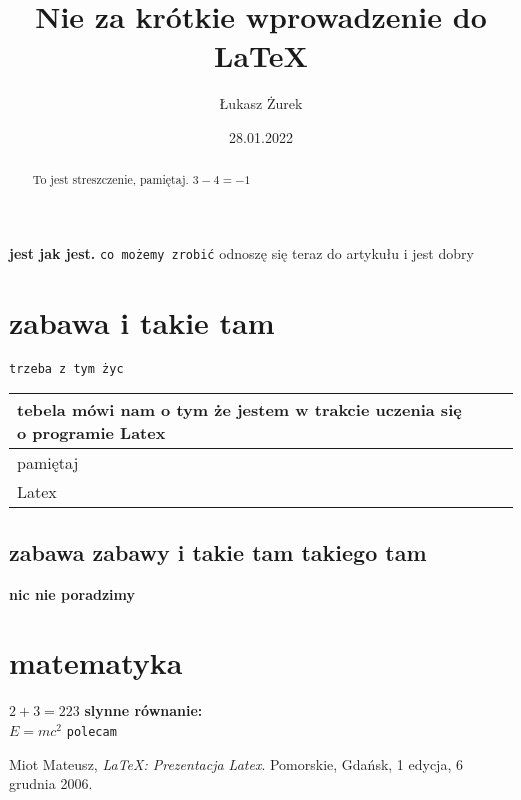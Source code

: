 \documentclass[12pt,a4paper]{article}
\title{Nie za krótkie wprowadzenie do \LaTeX}
\author{Łukasz Żurek}
\date{28.01.2022}
\begin{document}
\maketitle

\begin{abstract}
    To jest streszczenie, pamiętaj.
	$ 3 - 4 = -1$
\end{abstract}
\newpage
\textbf {jest jak jest.}
	\texttt {co możemy zrobić}
\tableofcontents
odnoszę się teraz do artykułu i jest dobry 
\newpage
\section{zabawa i takie tam }
	\texttt {trzeba z tym życ}
\begin{tabular}{|l|cr|}
\hline tebela mówi nam o tym że jestem w trakcie uczenia się o programie Latex \\ \hline
\hline pamiętaj \\ \hline
\hline Latex \\ \hline
\end{tabular}
	\subsection{zabawa zabawy i takie tam takiego tam}
		\textbf {nic nie poradzimy}
\newpage
\section{matematyka}
	\textrm {$ 2 + 3 = 223 $}
	\textbf {slynne równanie:} \\
	$E = mc^2$
	\texttt {polecam}
\newpage


\begin{thebibliography}{9}

  Miot Mateusz,
  \emph{\LaTeX: Prezentacja Latex}.
  Pomorskie, Gdańsk,
  1 edycja,
  6 grudnia 2006.

\end{thebibliography}
\end{document}
